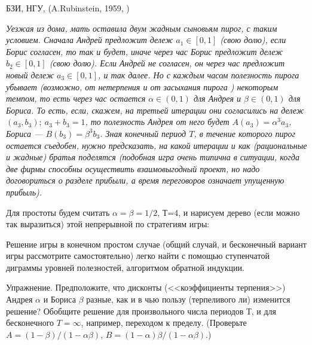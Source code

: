 \begin{problem}
\begin{source}
БЗИ, НГУ, (A.Rubinstein, 1959, \cite{miller:gtw})
\end{source}
 {\em
Уезжая из дома, мать оставила двум жадным сыновьям пирог, с
таким условием. Сначала Андрей предложит дележ $a_1\in
[0,1]$ (свою долю), если Борис согласен, то так и будет,
иначе через час Борис предложит дележ $b_2\in [0,1]$ (свою
долю). Если Андрей не согласен, он через час предложит
новый дележ $a_3\in [0,1]$, и так далее. Но с каждым часом
полезность пирога убывает (возможно, от нетерпения и от
засыхания пирога ) некоторым темпом, то есть через час
остается $\alpha\in (0,1)$ для Андрея и $\beta\in (0,1)$
для Бориса. То есть, если, скажем, на третьей итерации они
согласились на дележ $(a_3, b_3); ~ a_3+ b_3=1$, то
полезность Андрея от него будет $A(a_3)=\alpha^3 a_3$,
Бориса
--- $B(b_3)=\beta^3 b_3$. Зная конечный период $T$, в течение
которого пирог остается съедобен, нужно предсказать, на
какой итерации и как (рациональные и жадные) братья
поделятся (подобная игра очень типична в ситуации, когда
две фирмы способны осуществить взаимовыгодный проект, но
надо договориться о разделе прибыли, а время переговоров
означает упущенную прибыль).

Для простоты будем считать $\alpha = \beta =1/2$, Т=4, и
нарисуем дерево (если можно так выразиться) этой
непрерывной по стратегиям игры:

Решение игры в конечном простом случае (общий случай, и
бесконечный вариант игры рассмотрите самостоятельно) легко
найти с помощью ступенчатой диграммы уровней полезностей,
алгоритмом обратной индукции.

Упражнение. Предположите, что дисконты (<<коэффициенты
терпения>>) Андрея $\alpha$ и Бориса $\beta$ разные, как и в
чью пользу (терпеливого ли) изменится решение? Обобщите
решение для произвольного числа периодов Т, и для
бесконечного $T=\infty$, например, переходом к пределу.
(Проверьте $A=(1-\beta)/(1-\alpha\beta)$,
$B=(1-\alpha)\beta/(1-\alpha\beta)$.)}



\begin{sol}

\end{sol}
\end{problem}







